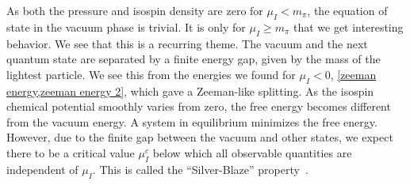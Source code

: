 As both the pressure and isospin density are zero for $\mu_I < m_\pi$, the equation of state in the vacuum phase is trivial.
It is only for $\mu_I \geq m_\pi$ that we get interesting behavior.
We see that this is a recurring theme.
The vacuum and the next quantum state are separated by a finite energy gap, given by the mass of the lightest particle.
We see this from the energies we found for $\mu_I < 0$, \cref{zeeman energy,zeeman energy 2}, which gave a Zeeman-like splitting.
As the isospin chemical potential smoothly varies from zero, the free energy becomes different from the vacuum energy.
A system in equilibrium minimizes the free energy. 
However, due to the finite gap between the vacuum and other states, we expect there to be a critical value $\mu_I^c$ below which all observable quantities are independent of $\mu_I$.
This is called the ``Silver-Blaze'' property~\cite{cohen:silver-blaze,cohen2}.


\FloatBarrier

